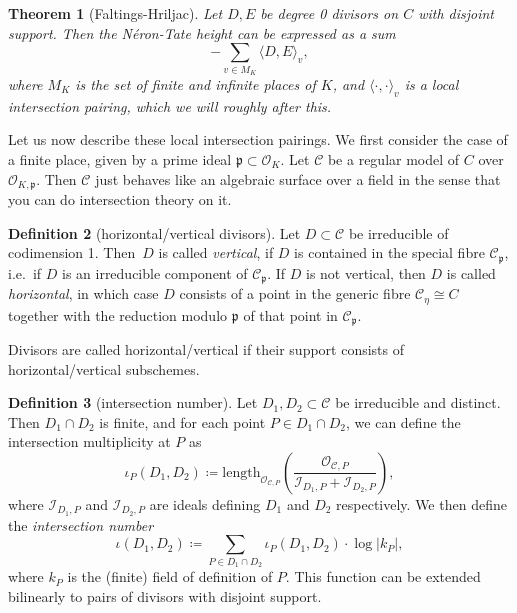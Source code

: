 \documentclass[12pt]{article}
\newtheorem{theorem}{Theorem}[section]
\theoremstyle{definition}
\newtheorem{definition}[theorem]{Definition}
\numberwithin{equation}{subsection}
\begin{document}
\begin{theorem}[Faltings-Hriljac]
Let $D,E$ be degree 0 divisors on $C$ with disjoint support. Then the N\'eron-Tate height can be expressed as a sum $$-\sum_{v \in M_K} \langle D, E \rangle_v,$$
where $M_K$ is the set of finite and infinite places of $K$, and $\langle \cdot, \cdot \rangle_v$ is a local intersection pairing, which we will roughly after this.
\end{theorem}

Let us now describe these local intersection pairings.
We first consider the case of a finite place, given by a prime ideal $\mathfrak{p} \subset \mathcal{O}_K$.
Let $\mathcal{C}$ be a regular model of $C$ over $\mathcal{O}_{K,\mathfrak{p}}$.
Then $\mathcal{C}$ just behaves like an algebraic surface over a field in the sense that you can do intersection theory on it.

\begin{definition}[horizontal/vertical divisors]
Let $D \subset \mathcal{C}$ be irreducible of codimension 1.
Then~$D$ is called {\em vertical}, if $D$ is contained in the special fibre $\mathcal{C}_\mathfrak{p}$, i.e.\ if $D$ is an irreducible component of $\mathcal{C}_\mathfrak{p}$.
If $D$ is not vertical, then $D$ is called {\em horizontal}, in which case $D$ consists of a point in the generic fibre $\mathcal{C}_{\eta} \cong C$ together with the reduction modulo $\mathfrak{p}$ of that point in $\mathcal{C}_\mathfrak{p}$.

Divisors are called horizontal/vertical if their support consists of horizontal/vertical subschemes.
\end{definition}

\begin{definition}[intersection number] \label{def:intersection}
Let $D_1, D_2 \subset \mathcal{C}$ be irreducible and distinct.
Then $D_1 \cap D_2$ is finite, and for each point $P \in D_1 \cap D_2$, we can define the intersection multiplicity at $P$ as
$$\iota_{P}(D_1, D_2) \coloneqq \mathrm{length}_{\mathcal{O}_{\mathcal{C},P}}\!\left( \frac{\mathcal{O}_{\mathcal{C},P}}{\mathcal{I}_{D_1,P} + \mathcal{I}_{D_2,P}}\right),$$
where $\mathcal{I}_{D_1,P}$ and $\mathcal{I}_{D_2,P}$ are ideals defining $D_1$ and $D_2$ respectively.
We then define the {\em intersection number}
$$\iota(D_1,D_2) \coloneqq \sum_{P \in D_1 \cap D_2} \iota_P(D_1,D_2) \cdot \log|k_P|,$$
where $k_P$ is the (finite) field of definition of $P$.
This function can be extended bilinearly to pairs of divisors with disjoint support.
\end{definition}
\end{document}
